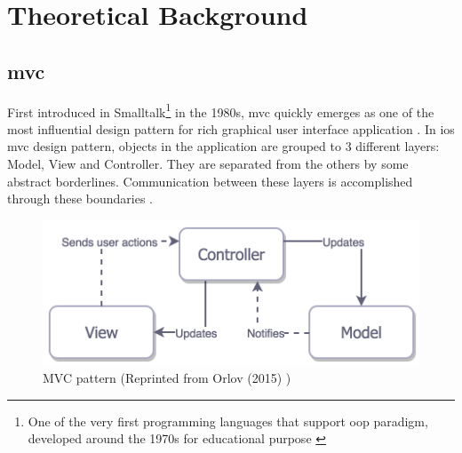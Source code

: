 \documentclass[11pt,a4paper,oneside,article]{memoir}
\begin{document}
\newpage
\chapter{Theoretical Background}\label{theoretical}

\section{\acrfull{mvc}} %

First introduced in Smalltalk\footnote{One of the very first programming languages that support \gls{oop} paradigm, developed around the 1970s for educational purpose \cite{smalltalk:definition}} in the 1980s, \gls{mvc} quickly emerges as one of the most influential design pattern for rich graphical user interface application \cite{pope:mvc}. In \gls{ios} \gls{mvc} design pattern, objects in the application are grouped to 3 different layers: Model, View and Controller. They are separated from the others by some abstract borderlines. Communication between these layers is accomplished through these boundaries \cite{apple:mvc}.

\begin{figure}[h]

\centering
\includegraphics[width=\textwidth]{mvc}

\caption{MVC pattern (Reprinted from Orlov (2015) \cite{medium:pattern})}
\label{fig:mvc}
\end{figure}

\end{document}
